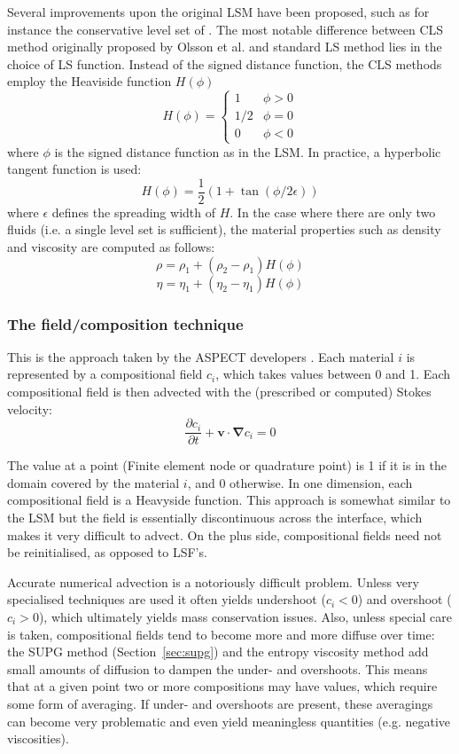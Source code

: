 Several improvements upon the original LSM have been proposed, 
such as for instance the conservative level set of \cite{zhbl14}.
The most notable difference between CLS method originally proposed by Olsson et al. \cite{olkr05,olkz07}
and standard LS method lies in the choice of LS function. Instead of the signed distance function, the
CLS methods employ the Heaviside function $H(\phi)$ 
\[
H(\phi)=
\left\{
\begin{array}{ll}
1 & \phi>0 \\
1/2 & \phi=0 \\
0 & \phi<0
\end{array}
\right.
\]
where $\phi$ is the signed distance function as in the LSM. 
In practice, a hyperbolic tangent function is used:
\[
H(\phi) = \frac{1}{2} (1+\tan (\phi/2\epsilon))
\]
where $\epsilon$ defines the spreading width of $H$. In the case where there are only 
two fluids (i.e. a single level set is sufficient), the material properties such as density and viscosity
are computed as follows:
\[
\rho=\rho_1+(\rho_2-\rho_1)H(\phi)
\]
\[
\eta=\eta_1+(\eta_2-\eta_1)H(\phi)
\]



\subsubsection{The field/composition technique}

This is the approach taken by the ASPECT developers \cite{krhb12,hedg17}. 
Each material $i$ is represented by a compositional field $c_i$, 
which takes values between 0 and 1.
Each compositional field is then advected with the (prescribed or computed) Stokes velocity:
\[
\frac{\partial c_i}{\partial t} + {\bm v}\cdot {\bm \nabla }c_i = 0
\]

The value at a point (Finite element node or quadrature point) is 1 if it is in the 
domain covered by the material $i$, and 0 otherwise.
In one dimension, each compositional field is a Heavyside function. 
This approach is somewhat similar to the LSM but the field is essentially 
discontinuous across the interface, which makes it very difficult to advect.  
On the plus side, compositional fields need not be reinitialised, as opposed to LSF's.

Accurate numerical advection is a notoriously difficult problem. Unless very specialised 
techniques are used it often yields undershoot ($c_i<0$) and overshoot ($c_i>0$), which 
ultimately yields mass conservation issues. Also, unless special care is taken, 
compositional fields tend to become more and more diffuse over time: the SUPG method (Section~\ref{sec:supg})
and the entropy viscosity method add small amounts of diffusion to dampen the under- and 
overshoots. This means that at a given point two or more compositions may have values, 
which require some form of averaging. If under- and overshoots are present, these averagings
can become very problematic and even yield meaningless quantities (e.g. negative viscosities).

